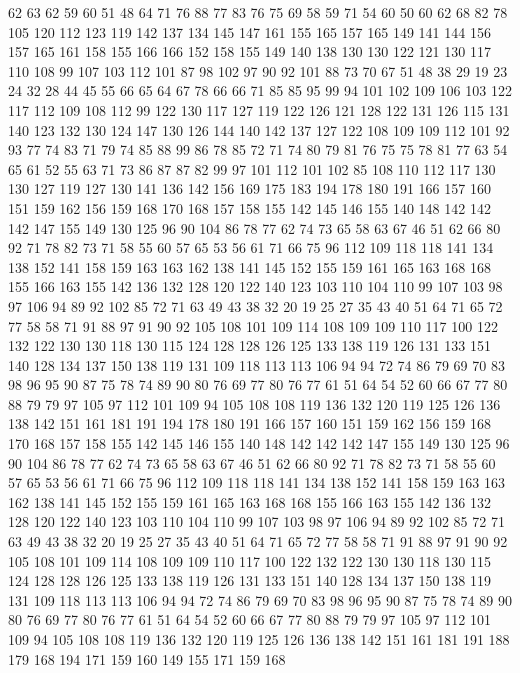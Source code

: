 62 63 62 59 60 51 48 64 71 76 88 77 83 76 75 69 58 59 71 54
60 50 60 62 68 82 78 105 120 112 123 119 142 137 134 145 147 161 155 165
157 165 149 141 144 156 157 165 161 158 155 166 166 152 158 155 149 140 138 130
130 122 121 130 117 110 108 99 107 103 112 101 87 98 102 97 90 92 101 88
73 70 67 51 48 38 29 19 23 24 32 28 44 45 55 66 65 64 67 78
66 66 71 85 85 95 99 94 101 102 109 106 103 122 117 112 109 108 112 99
122 130 117 127 119 122 126 121 128 122 131 126 115 131 140 123 132 130 124 147
130 126 144 140 142 137 127 122 108 109 109 112 101 92 93 77 74 83 71 79
74 85 88 99 86 78 85 72 71 74 80 79 81 76 75 75 78 81 77 63
54 65 61 52 55 63 71 73 86 87 87 82 99 97 101 112 101 102 85 108
110 112 117 130 130 127 119 127 130 141 136 142 156 169 175 183 194 178 180 191
166 157 160 151 159 162 156 159 168 170 168 157 158 155 142 145 146 155 140 148
142 142 142 147 155 149 130 125 96 90 104 86 78 77 62 74 73 65 58 63
67 46 51 62 66 80 92 71 78 82 73 71 58 55 60 57 65 53 56 61
71 66 75 96 112 109 118 118 141 134 138 152 141 158 159 163 163 162 138 141
145 152 155 159 161 165 163 168 168 155 166 163 155 142 136 132 128 120 122 140
123 103 110 104 110 99 107 103 98 97 106 94 89 92 102 85 72 71 63 49
43 38 32 20 19 25 27 35 43 40 51 64 71 65 72 77 58 58 71 91
88 97 91 90 92 105 108 101 109 114 108 109 109 110 117 100 122 132 122 130
130 118 130 115 124 128 128 126 125 133 138 119 126 131 133 151 140 128 134 137
150 138 119 131 109 118 113 113 106 94 94 72 74 86 79 69 70 83 98 96
95 90 87 75 78 74 89 90 80 76 69 77 80 76 77 61 51 64 54 52
60 66 67 77 80 88 79 79 97 105 97 112 101 109 94 105 108 108 119 136
132 120 119 125 126 136 138 142 151 161 181 191 194 178 180 191 166 157 160 151
159 162 156 159 168 170 168 157 158 155 142 145 146 155 140 148 142 142 142 147
155 149 130 125 96 90 104 86 78 77 62 74 73 65 58 63 67 46 51 62
66 80 92 71 78 82 73 71 58 55 60 57 65 53 56 61 71 66 75 96
112 109 118 118 141 134 138 152 141 158 159 163 163 162 138 141 145 152 155 159
161 165 163 168 168 155 166 163 155 142 136 132 128 120 122 140 123 103 110 104
110 99 107 103 98 97 106 94 89 92 102 85 72 71 63 49 43 38 32 20
19 25 27 35 43 40 51 64 71 65 72 77 58 58 71 91 88 97 91 90
92 105 108 101 109 114 108 109 109 110 117 100 122 132 122 130 130 118 130 115
124 128 128 126 125 133 138 119 126 131 133 151 140 128 134 137 150 138 119 131
109 118 113 113 106 94 94 72 74 86 79 69 70 83 98 96 95 90 87 75
78 74 89 90 80 76 69 77 80 76 77 61 51 64 54 52 60 66 67 77
80 88 79 79 97 105 97 112 101 109 94 105 108 108 119 136 132 120 119 125
126 136 138 142 151 161 181 191 188 179 168 194 171 159 160 149 155 171 159 168
